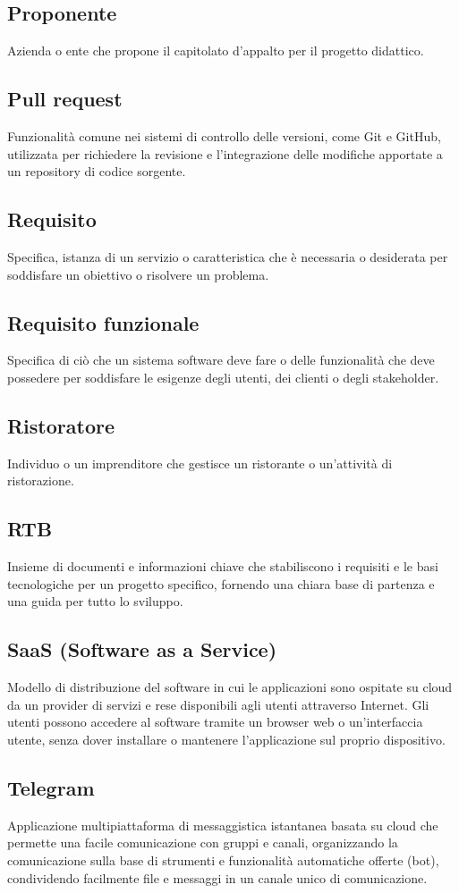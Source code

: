 \subsection{Proponente}Azienda o ente che propone il capitolato d’appalto per il progetto didattico.
\subsection{Pull request}Funzionalità comune nei sistemi di controllo delle versioni, come Git e GitHub, utilizzata per richiedere la revisione e l'integrazione delle modifiche apportate a un repository di codice sorgente.
\subsection{Requisito}Specifica, istanza di un servizio o caratteristica che è necessaria o desiderata per soddisfare un obiettivo o risolvere un problema.
\subsection{Requisito funzionale}Specifica di ciò che un sistema software deve fare o delle funzionalità che deve possedere per soddisfare le esigenze degli utenti, dei clienti o degli stakeholder.
\subsection{Ristoratore}Individuo o un imprenditore che gestisce un ristorante o un'attività di ristorazione.
\subsection{RTB}Insieme di documenti e informazioni chiave che stabiliscono i requisiti e le basi tecnologiche per un progetto specifico, fornendo una chiara base di partenza e una guida per tutto lo sviluppo.
\subsection{SaaS (Software as a Service)}Modello di distribuzione del software in cui le applicazioni sono ospitate su cloud da un provider di servizi e rese disponibili agli utenti attraverso Internet. Gli utenti possono accedere al software tramite un browser web o un'interfaccia utente, senza dover installare o mantenere l'applicazione sul proprio dispositivo.
\subsection{Telegram}Applicazione multipiattaforma di messaggistica istantanea basata su cloud che permette una facile comunicazione con gruppi e canali, organizzando la comunicazione sulla base di strumenti e funzionalità automatiche offerte (bot), condividendo facilmente file e messaggi in un canale unico di comunicazione.
